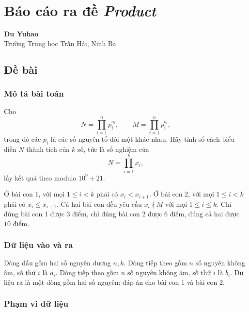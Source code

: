 \documentclass[11pt]{article}
\begin{document}
\section{Báo cáo ra đề \emph{Product}}

\begin{center}
\textbf{Du Yuhao}\\
Trường Trung học Trấn Hải, Ninh Ba
\end{center}

\subsection{Đề bài}

\subsubsection{Mô tả bài toán}

Cho
\[
  N=\prod_{i=1}^{n}p_i^{a_i},\qquad
  M=\prod_{i=1}^{n}p_i^{b_i},
\]
trong đó các \(p_i\) là các số nguyên tố đôi một khác nhau. Hãy tính số cách
biểu diễn \(N\) thành tích của \(k\) số, tức là số nghiệm của
\[
  N=\prod_{i=1}^{k}x_i,
\]
lấy kết quả theo modulo \(10^9+21\).

Ở bài con 1, với mọi \(1\le i<k\) phải có \(x_i<x_{i+1}\). Ở bài con 2, với
mọi \(1\le i<k\) phải có \(x_i\le x_{i+1}\). Cả hai bài con đều yêu cầu
\(x_i\nmid M\) với mọi \(1\le i\le k\). Chỉ đúng bài con 1 được \(3\) điểm,
chỉ đúng bài con 2 được \(6\) điểm, đúng cả hai được \(10\) điểm.

\subsubsection{Dữ liệu vào và ra}

Dòng đầu gồm hai số nguyên dương \(n,k\). Dòng tiếp theo gồm \(n\) số nguyên
không âm, số thứ \(i\) là \(a_i\). Dòng tiếp theo gồm \(n\) số nguyên không âm,
số thứ \(i\) là \(b_i\). Dữ liệu ra là một dòng gồm hai số nguyên: đáp án cho
bài con 1 và bài con 2.

\subsubsection{Phạm vi dữ liệu}
\end{document}
